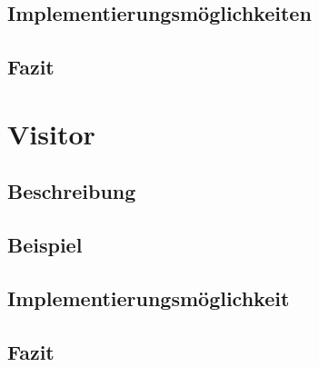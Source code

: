 \documentclass[a4paper,11pt]{scrartcl}
\begin{document}
\subsection{Implementierungsmöglichkeiten}

\subsection{Fazit}


\section{Visitor}

\subsection{Beschreibung}

\subsection{Beispiel}

\subsection{Implementierungsmöglichkeit}

\subsection{Fazit}


\pagebreak

\end{document}
